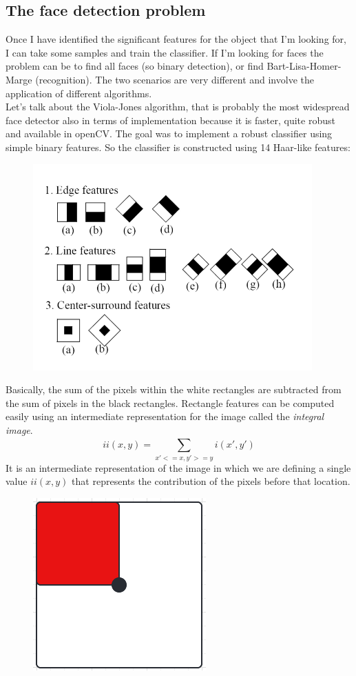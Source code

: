 \subsection{The face detection problem}
Once I have identified the significant features for the object that I'm looking for, I can take some samples and train the classifier.
If I’m looking for faces the problem can be to find all faces (so binary detection), or find Bart-Lisa-Homer-Marge (recognition).
The two scenarios are very different and involve the application of different algorithms.
\\Let's talk about the Viola-Jones algorithm, that is probably the most widespread face detector also in terms of implementation because it is faster, quite robust and available in openCV.
The goal was to implement a robust classifier using simple binary features.
So the classifier is constructed using 14 Haar-like features:
\begin{figure}[h]
    \centering
    \includegraphics[scale=0.7]{Figures/ViolaJones.png}
\end{figure}
Basically, the sum of the pixels within the white rectangles are subtracted from the sum of pixels in the black rectangles.
Rectangle features can be computed easily using an intermediate representation for the image called the \textit{integral image}.
\[ii(x,y)=\sum_{x'<=x, y'>=y}^{}i(x', y')\]
It is an intermediate representation of the image in which we are defining a single value $ii(x,y)$ that represents the contribution of the pixels before that location.
\begin{figure}
    \includegraphics[width=0.5\linewidth]{Figures/IntegralImage.png}
\end{figure}
